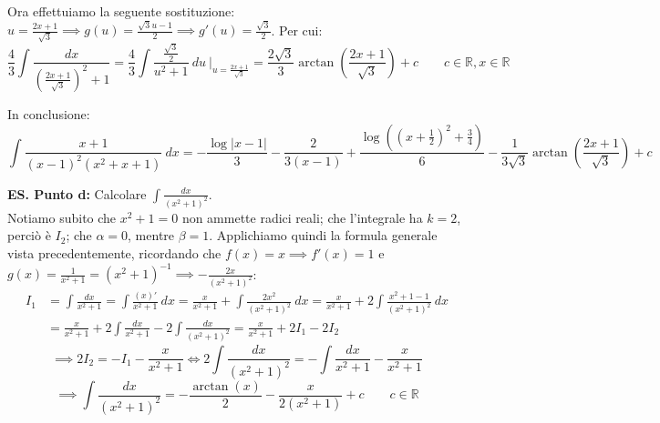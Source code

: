 \documentclass{article}
\begin{document}
\noindent Ora effettuiamo la seguente sostituzione: $u = \frac{2x + 1}{\sqrt{3}} \implies g(u) = \frac{\sqrt{3} u - 1}{2} \implies g'(u) = \frac{\sqrt{3}}{2}$. Per cui:
\begin{equation*}
    \frac{4}{3} \int \frac{dx}{(\frac{2x + 1}{\sqrt{3}})^2 + 1} = \frac{4}{3} \int \frac{\frac{\sqrt{3}}{2}}{u^2 + 1} \ du \ \bigg|_{u = \frac{2x + 1}{\sqrt{3}}} = \frac{2\sqrt{3}}{3}\arctan\left(\frac{2x + 1}{\sqrt{3}}\right) + c \qquad c \in \mathbb{R}, x \in \mathbb{R}
\end{equation*}

\noindent In conclusione:
\begin{equation*}
    \int \frac{x + 1}{(x - 1)^2(x^2 + x + 1)} \ dx = -\frac{\log|x - 1|}{3} - \frac{2}{3(x - 1)} + \frac{\log((x + \frac{1}{2})^2 + \frac{3}{4})}{6} - \frac{1}{3\sqrt{3}}\arctan\left(\frac{2x + 1}{\sqrt{3}}\right) + c
\end{equation*}

\noindent\textbf{ES. Punto d:} Calcolare $\int \frac{dx}{(x^2 + 1)^2}$.\\
Notiamo subito che $x^2 + 1 = 0$ non ammette radici reali; che l'integrale ha $k = 2$, perciò è $I_2$; che $\alpha = 0$, mentre $\beta = 1$. Applichiamo quindi la formula generale vista precedentemente, ricordando che $f(x) = x \implies f'(x) = 1$ e $g(x) = \frac{1}{x^2 + 1} = (x^2 + 1)^{-1} \implies - \frac{2x}{(x^2 + 1)^2}$:
\begin{align*}
    I_1 &= \int \frac{dx}{x^2 + 1} = \int \frac{(x)'}{x^2 + 1} \ dx= \frac{x}{x^2 + 1} + \int \frac{2x^2}{(x^2 + 1)^2} \ dx = \frac{x}{x^2 + 1} + 2\int \frac{x^2 + 1 - 1}{(x^2 + 1)^2} \ dx \\
    &= \frac{x}{x^2 + 1} + 2\int \frac{dx}{x^2 + 1} - 2\int \frac{dx}{(x^2 + 1)^2} = \frac{x}{x^2 + 1} + 2I_1 - 2I_2
\end{align*}
\begin{equation*}
    \implies 2I_2 = -I_1 - \frac{x}{x^2 + 1} \iff 2\int \frac{dx}{(x^2 + 1)^2} = -\int \frac{dx}{x^2 + 1} - \frac{x}{x^2 + 1}
\end{equation*}
\begin{equation*}
    \implies \int \frac{dx}{(x^2 + 1)^2} = -\frac{\arctan(x)}{2} - \frac{x}{2(x^2 + 1)} + c \qquad c \in \mathbb{R}
\end{equation*}
\end{document}
